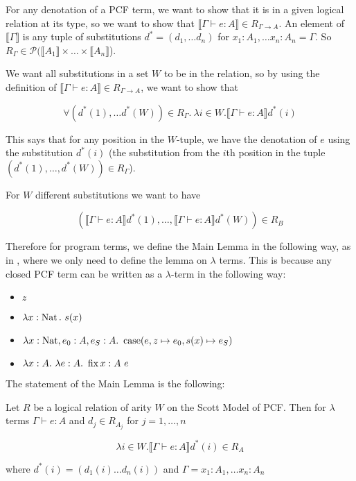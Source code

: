 \vspace{0.5cm}

For any denotation of a PCF term, we want to show that it is in a given logical relation at its type, so we want to show that $\llbracket \Gamma \vdash e : A \rrbracket \in R_{\Gamma \to A}$. An element of $\llbracket \Gamma \rrbracket$ is any tuple of substitutions $d^* = (d_1, \dots d_n)$ for $x_1 : A_1, \dots x_n :A_n = \Gamma$. So $R_\Gamma \in \mathcal{P}(\llbracket A_1 \rrbracket \times \dots \times \llbracket A_n \rrbracket$).

We want all substitutions in a set $W$ to be in the relation, so by using the definition of $\llbracket \Gamma \vdash e : A \rrbracket \in R_{\Gamma \to A}$, we want to show that 

\[ \forall (d^*(1), \dots d^*(W)) \in R_\Gamma. \ \lambda i \in W. \llbracket \Gamma \vdash e : A \rrbracket d^*(i)\]

This says that for any position in the $W$-tuple, we have the denotation of $e$ using the substitution $d^*(i)$ (the substitution from the $i$th position in the tuple $(d^*(1), \dots, d^*(W)) \in R_\Gamma$).

For $W$ different substitutions we want to have

\[(\llbracket \Gamma \vdash e : A \rrbracket d^*(1) , \dots, \llbracket \Gamma \vdash e : A \rrbracket d^*(W)) \in R_B \]

Therefore for program terms, we define the Main Lemma in the following way, as in \citep{Streicher06}, where we only need to define the lemma on $\lambda$ terms. This is because any closed PCF term can be written as a $\lambda$-term in the following way:

\begin{itemize}
\item{$z$}
\item{$\lambda x: \nat. \ s(x)$}
\item{$\lambda x: \operatorname{Nat}, e_0 : A, e_S: A. \  \operatorname{case}(e,z \mapsto e_0,s(x) \mapsto e_S)$}
\item{$\lambda x : A. \ \lambda e: A . \ \operatorname{fix} x:A \ e $}
\end{itemize}

The statement of the Main Lemma is the following:

\vspace{0.5cm}

\begin{lem}\label{main2}
Let $R$ be a logical relation of arity $W$ on the Scott Model of PCF. Then for $\lambda$ terms $\Gamma \vdash e : A$ and $d_j \in R_{A_j}$ for $j = 1, \dots, n$

\[ \lambda i \in W. \llbracket \Gamma \vdash e : A \rrbracket d^*(i) \in R_A\]

where $d^*(i) = (d_1(i) \dots d_n(i))$ and $\Gamma = x_1 : A_1 , \dots x_n : A_n$
\end{lem}

